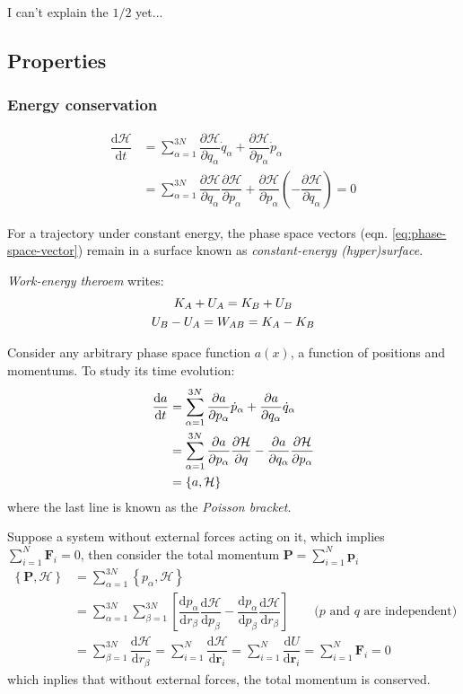 \documentclass[
  10pt,
  twoside,
  openany,
  b5paper, %
  colorscheme = bootstrap-v4, %
]{qyxf-book}
\numberwithin{equation}{section}
\newcommand{\md}{\mathrm{d}}
\newcommand{\der}[2]{\dfrac{\md #1}{\md #2}}
\newcommand{\p}[2]{\dfrac{\partial #1}{\partial #2}}
\newcommand{\vF}{\boldsymbol{F}}
\newcommand{\vr}{\boldsymbol{r}}
\newcommand{\vp}{\boldsymbol{p}}
\newcommand{\sumin}{\sum_{i=1}^N}
\newcommand{\suman}{\sum_{\alpha=1}^{3N}}
\newcommand{\ham}{\mathcal{H}} %
\begin{document}
\supplement I can't explain the $1/2$ yet...

\subsection{Properties}

\vspace{0.5em}
\subsubsection{Energy conservation}
\vspace{-1.2em}
\begin{align*}
	\der{\ham}{t}&=\suman \p{\ham}{q_\alpha}\dot{q}_\alpha+\p{\ham}{p_\alpha}\dot{p}_\alpha\\
	&=\suman\p{\ham}{q_\alpha}\p{\ham}{p_\alpha}+\p{\ham}{p_\alpha}(-\p{\ham}{q_\alpha})=0
\end{align*}

For a trajectory under constant energy, the phase space vectors (eqn. \ref{eq:phase-space-vector}) remain in a surface known as \textit{constant-energy (hyper)surface}.

\textit{Work-energy theroem} writes:
\begin{gather}
	K_A+U_A=K_B+U_B \notag\\
	U_B-U_A=W_{AB}=K_A-K_B
\end{gather}

Consider any arbitrary phase space function $a(x)$, a function of positions and momentums. To study its time evolution:
\begin{align}
	\der{a}{t}&=\suman\p{a}{p_\alpha}\dot{p}_\alpha+\p{a}{q_\alpha}\dot{q}_\alpha \notag\\
	&=\suman\p{a}{p_\alpha}\p{\ham}{q}-\p{a}{q_\alpha}\p{\ham}{p_\alpha}\\
	&=\left\{a,\ham\right\} \label{eq:poisson-bracket}
\end{align}
where the last line is known as the \textit{Poisson bracket}.

\example Suppose a system without external forces acting on it, which implies $\sumin \vF_i=0$, then consider the total momentum $\boldsymbol{P}=\sumin\vp_i$
\begin{align*}
	\left\{\boldsymbol{P},\ham\right\}&=\suman\left\{p_\alpha,\ham\right\}\\
	&=\suman\sum_{\beta=1}^{3N}\left[\der{p_\alpha}{r_\beta}\der{\ham}{p_\beta}-\der{p_\alpha}{p_\beta}\der{\ham}{r_\beta}\right] \qquad\text{($p$ and $q$ are independent)}\\
	&=\sum_{\beta=1}^{3N}\der{\ham}{r_\beta}=\sumin\der{\ham}{\vr_i}=\sumin\der{U}{\vr_i}=\sumin\vF_i=0
\end{align*}
which inplies that without external forces, the total momentum is conserved.
\end{document}
